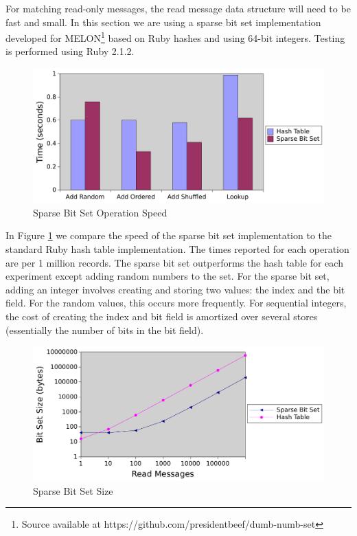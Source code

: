 For matching read-only messages, the read message data structure will need to be fast and small. In this section we are using a sparse bit set implementation developed for MELON\footnote{Source available at https://github.com/presidentbeef/dumb-numb-set} based on Ruby hashes and using 64-bit integers. Testing is performed using Ruby 2.1.2.

\begin{figure}
\centering
\includegraphics[scale = 0.75]{figures/bitset-speed.pdf}
\caption{Sparse Bit Set Operation Speed}
\label{fig:bitsetspeed}
\end{figure}

In Figure \ref{fig:bitsetspeed} we compare the speed of the sparse bit set implementation to the standard Ruby hash table implementation. The times reported for each operation are per 1 million records. The sparse bit set outperforms the hash table for each experiment except adding random numbers to the set. For the sparse bit set, adding an integer involves creating and storing two values: the index and the bit field. For the random values, this occurs more frequently. For sequential integers, the cost of creating the index and bit field is amortized over several stores (essentially the number of bits in the bit field).

\begin{figure}
\centering
\includegraphics[scale = 0.80]{figures/bitset-size.pdf}
\caption{Sparse Bit Set Size}
\label{fig:bitsetsize}
\end{figure}

